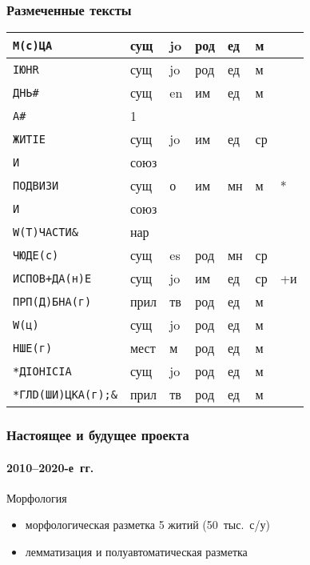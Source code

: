 \begin{frame}
  \frametitle{Размеченные тексты}

  \footnotesize \setlength{\aboverulesep}{0.5pt} \setlength{\belowrulesep}{0.5pt}
  \begin{tabularx}{\textwidth}{Xp{0.75cm}p{0.75cm}p{0.75cm}p{0.75cm}p{0.75cm}p{0.75cm}}
    \toprule
    \texttt{М(с)ЦА} & сущ  & jo & род & ед & м  &    \\ \midrule
    \texttt{IЮНR} & сущ  & jo & род & ед & м  &    \\ \midrule
    \texttt{ДНЬ\#} & сущ  & en & им  & ед & м  &    \\ \midrule
    \texttt{А\#} & 1    &    &     &    &    &    \\ \midrule
    \texttt{ЖИТIЕ} & сущ  & jo & им  & ед & ср &    \\ \midrule
    \texttt{И} & союз &    &     &    &    &    \\ \midrule
    \texttt{ПОДВИЗИ} & сущ  & о  & им  & мн & м  & *  \\ \midrule
    \texttt{И} & союз &    &     &    &    &    \\ \midrule
    \texttt{W(Т)ЧАСТИ\&} & нар  &    &     &    &    &    \\ \midrule
    \texttt{ЧЮДЕ(с)} & сущ  & es & род & мн & ср &    \\ \midrule
    \texttt{ИСПОВ+ДА(н)Е} & сущ  & jo & им  & ед & ср & +и \\ \midrule
    \texttt{ПРП(Д)БНА(г)} & прил & тв & род & ед & м  &    \\ \midrule
    \texttt{W(ц)} & сущ  & jo & род & ед & м  &    \\ \midrule
    \texttt{НШЕ(г)} & мест & м  & род & ед & м  &    \\ \midrule
    \texttt{*ДIОНIСIА} & сущ  & jo & род & ед & м  &    \\ \midrule
    \texttt{*ГЛD(ШИ)ЦКА(г);\&} & прил & тв & род & ед & м  &    \\ \bottomrule
  \end{tabularx}
\end{frame}

\begin{frame}
  \frametitle{Настоящее и будущее проекта}
  \framesubtitle{2010--2020-е~гг.}

  \begin{block}{Морфология}
    \begin{itemize}
      \item морфологическая разметка 5 житий (50~тыс.\ с/у)
      \item лемматизация и полуавтоматическая разметка\autocite{sipunin:2020}
    \end{itemize}
  \end{block}
\end{frame}

